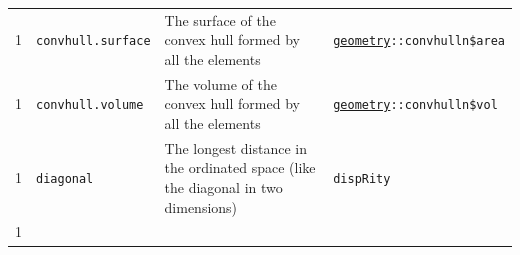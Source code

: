 \documentclass[]{book}
\theoremstyle{definition}
\theoremstyle{definition}
\theoremstyle{definition}
\theoremstyle{remark}
\begin{document}
\begin{longtable}[]{@{}llll@{}}
\begin{minipage}[t]{0.08\columnwidth}
1\strut
\end{minipage} & \begin{minipage}[t]{0.08\columnwidth}\raggedright\strut
\texttt{convhull.surface}\strut
\end{minipage} & \begin{minipage}[t]{0.61\columnwidth}\raggedright\strut
The surface of the convex hull formed by all the elements\strut
\end{minipage} & \begin{minipage}[t]{0.11\columnwidth}\raggedright\strut
\href{https://cran.r-project.org/web/packages/geometry/index.html}{\texttt{geometry}}\texttt{::convhulln\$area}\strut
\end{minipage}\tabularnewline
\begin{minipage}[t]{0.08\columnwidth}\raggedright\strut
1\strut
\end{minipage} & \begin{minipage}[t]{0.08\columnwidth}\raggedright\strut
\texttt{convhull.volume}\strut
\end{minipage} & \begin{minipage}[t]{0.61\columnwidth}\raggedright\strut
The volume of the convex hull formed by all the elements\strut
\end{minipage} & \begin{minipage}[t]{0.11\columnwidth}\raggedright\strut
\href{https://cran.r-project.org/web/packages/geometry/index.html}{\texttt{geometry}}\texttt{::convhulln\$vol}\strut
\end{minipage}\tabularnewline
\begin{minipage}[t]{0.08\columnwidth}\raggedright\strut
1\strut
\end{minipage} & \begin{minipage}[t]{0.08\columnwidth}\raggedright\strut
\texttt{diagonal}\strut
\end{minipage} & \begin{minipage}[t]{0.61\columnwidth}\raggedright\strut
The longest distance in the ordinated space (like the diagonal in two
dimensions)\strut
\end{minipage} & \begin{minipage}[t]{0.11\columnwidth}\raggedright\strut
\texttt{dispRity}\strut
\end{minipage}\tabularnewline
\begin{minipage}[t]{0.08\columnwidth}\raggedright\strut
1\strut
\end{minipage} & \begin{minipage}[t]{0.08\columnwidth}\raggedright\strut

\end{minipage}
\end{longtable}
\end{document}
